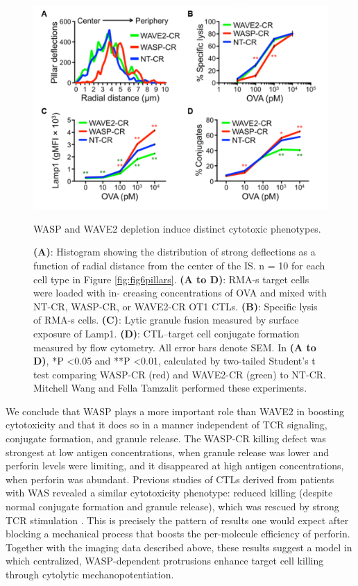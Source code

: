 \begin{figure}[htbp]
	\centering
	\includegraphics[width=\textwidth]{../figures/chapter2/fig6crisprs.png}
	\caption{WASP and WAVE2 depletion induce distinct cytotoxic phenotypes.}
	\caption*{\textbf{(A)}: Histogram showing the distribution of strong deflections as a function of radial distance from the center of the IS. n = 10 for each cell type in Figure \ref{fig:fig6pillars}. \textbf{(A to D)}: RMA-s target cells were loaded with in- creasing concentrations of OVA and mixed with NT-CR, WASP-CR, or WAVE2-CR OT1 CTLs. \textbf{(B)}: Specific lysis of RMA-s cells. \textbf{(C)}: Lytic granule fusion measured by surface exposure of Lamp1. \textbf{(D)}: CTL–target cell conjugate formation measured by flow cytometry. All error bars denote SEM. In \textbf{(A to D)}, *P \textless 0.05 and **P \textless 0.01, calculated by two-tailed Student’s t test comparing WASP-CR (red) and WAVE2-CR (green) to NT-CR. Mitchell Wang and Fella Tamzalit performed these experiments.}
	\label{fig:fig6crisprs}
\end{figure}

We conclude that WASP plays a more important role than WAVE2 in boosting cytotoxicity and that it does so in a manner independent of TCR signaling, conjugate formation, and granule release. The WASP-CR killing defect was strongest at low antigen concentrations, when granule release was lower and perforin levels were limiting, and it disappeared at high antigen concentrations, when perforin was abundant. Previous studies of CTLs derived from patients with WAS revealed a similar cytotoxicity phenotype: reduced killing (despite normal conjugate formation and granule release), which was rescued by strong TCR stimulation \cite{Calvez2011, DeMeester2010}. This is precisely the pattern of results one would expect after blocking a mechanical process that boosts the per-molecule efficiency of perforin. Together with the imaging data described above, these results suggest a model in which centralized, WASP-dependent protrusions enhance target cell killing through cytolytic mechanopotentiation.

